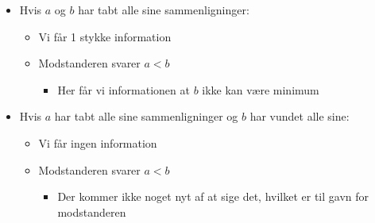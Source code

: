 \begin{frame}[allowframebreaks]
\begin{itemize}
   \item Hvis $a$ og $b$ har tabt alle sine sammenligninger:
         \begin{itemize}
           \item Vi får 1 stykke information
           \item Modstanderen svarer $a < b$
                 \begin{itemize}
                   \item Her får vi informationen at $b$ ikke kan være minimum
                 \end{itemize}
         \end{itemize}
   \item Hvis $a$ har tabt alle sine sammenligninger og $b$ har vundet alle sine:
         \begin{itemize}
           \item Vi får ingen information
           \item Modstanderen svarer $a < b$
                 \begin{itemize}
                   \item Der kommer ikke noget nyt af at sige det, hvilket er til gavn for modstanderen
                 \end{itemize}
         \end{itemize}


\end{itemize}
\end{frame}
